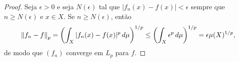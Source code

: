 \begin{proof}
    Seja $\epsilon > 0$ e seja $N(\epsilon)$ tal que $|f_n(x) - f(x)| < \epsilon$ sempre que $n \geq N(\epsilon)$ e $x \in X$. Se $n \geq N(\epsilon)$, então
    \begin{equation}
        \left\lVert f_n - f \right\rVert_p = \left( \int_X |f_n(x) - f(x)|^p \, d\mu \right)^{1/p}
        \leq \left( \int_X \epsilon^p \, d\mu \right)^{1/p}
        = \epsilon \mu(X)^{1/p},
    \end{equation}
    de modo que $(f_n)$ converge em $L_p$ para $f$.
\end{proof}

